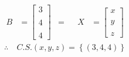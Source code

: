 \documentclass[10pt, a4paper]{article}
\begin{document}
\begin{multicols}{2}
\begin{align*}
  B&=\left[
    \begin{array}{c}
      3\\\\
      4\\\\
      4
    \end{array}
  \right]
  &=
  &&X&=\left[
    \begin{array}{c}
      x \\\\
      y \\\\
      z 
    \end{array}
  \right]
\end{align*}
\begin{align*}
  \therefore \ &C.S. \left(x,y,z\right) = \left\{\left(3,4,4\right)\right\}
\end{align*}
\columnseprule=1pt
\end{multicols}
\newpage
\end{document}
